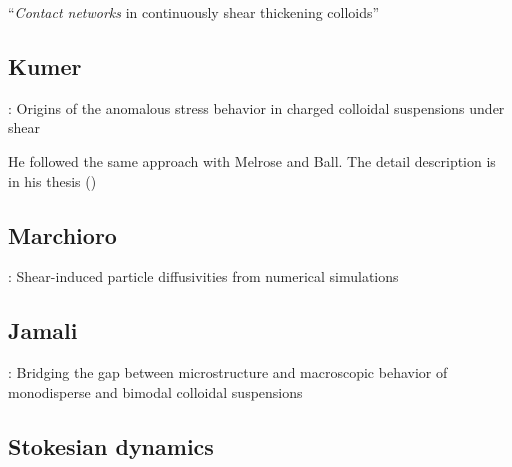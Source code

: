 \documentclass[12pt]{article}
\begin{document}
\citet{Melrose_2004}
``\emph{Contact networks} in continuously shear thickening colloids''


\subsection*{Kumer}

\citet{Kumar_2010}:
Origins of the anomalous stress behavior in charged colloidal suspensions under shear

He followed the same approach with Melrose and Ball.
The detail description is in his thesis (\citet{Kumar_2010a})

\subsection*{Marchioro}

\citet{Marchioro_2001}:
Shear-induced particle diffusivities from numerical simulations

\subsection*{Jamali}

\citet{Jamali_2013}:
Bridging the gap between microstructure and macroscopic behavior of 
monodisperse and bimodal colloidal suspensions


\subsection*{Stokesian dynamics}
\end{document}
